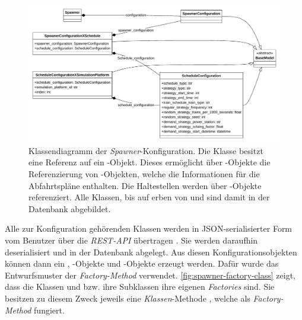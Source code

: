 \begin{figure}[!ht]
	\centering
	\includegraphics[width=1.0\linewidth]{images/diagrams/spawner-config-class.pdf}
	\caption{Klassendiagramm der \emph{Spawner}-Konfiguration. Die Klasse  besitzt eine Referenz auf ein -Objekt. Dieses ermöglicht über -Objekte die Referenzierung von -Objekten, welche die Informationen für die Abfahrtspläne enthalten. Die Haltestellen werden über -Objekte referenziert. Alle Klassen, bis auf  erben von  und sind damit in der Datenbank abgebildet.}
	\label{fig:spawner-config-class}
\end{figure}

Alle zur Konfiguration gehörenden Klassen werden in JSON-serialisierter Form vom Benutzer über die \emph{REST-API} übertragen \cite{kamp_architektur_2023}. Sie werden daraufhin deserialisiert und in der Datenbank abgelegt. Aus diesen Konfigurationsobjekten können dann ein , -Objekte und -Objekte erzeugt werden. Dafür wurde das Entwurfsmuster der \emph{Factory-Method} verwendet. \autoref{fig:spawner-factory-class} zeigt, dass die Klassen  und  bzw. ihre Subklassen ihre eigenen \emph{Factories} sind. Sie besitzen zu diesem Zweck jeweils eine \emph{Klassen}-Methode , welche als \emph{Factory-Method} fungiert.

